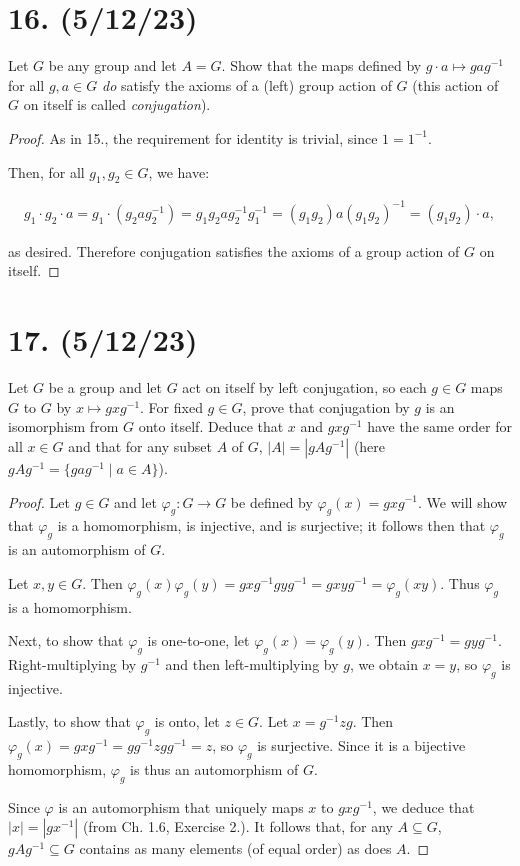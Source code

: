 \documentclass{article}
\begin{document}
\section*{16. (5/12/23)}

Let $G$ be any group and let $A = G$. Show that the maps defined by $g \cdot a \mapsto gag^{-1}$ for all $g, a \in G$ \emph{do} satisfy the axioms of a (left) group action of $G$ (this action of $G$ on itself is called \emph{conjugation}).

\begin{proof}
  As in 15., the requirement for identity is trivial, since $1 = 1^{-1}$.

  Then, for all $g_1, g_2 \in G$, we have:

  \begin{multline*}
    g_1 \cdot g_2 \cdot a = g_1 \cdot (g_2 a g_2^{-1}) = g_1 g_2 a g_2^{-1} g_1^{-1} = (g_1 g_2) a (g_1 g_2)^{-1} = (g_1 g_2) \cdot a,
  \end{multline*}

  as desired. Therefore conjugation satisfies the axioms of a group action of $G$ on itself.
\end{proof}

\section*{17. (5/12/23)}

Let $G$ be a group and let $G$ act on itself by left conjugation, so each $g \in G$ maps $G$ to $G$ by $x \mapsto gxg^{-1}$. For fixed $g \in G$, prove that conjugation by $g$ is an isomorphism from $G$ onto itself. Deduce that $x$ and $gxg^{-1}$ have the same order for all $x \in G$ and that for any subset $A$ of $G$, $|A| = |gAg^{-1}|$ (here $gAg^{-1} = \{ gag^{-1} \mid a \in A \}$).

\begin{proof}
  Let $g \in G$ and let $\varphi_g: G \rightarrow G$ be defined by $\varphi_g(x) = gxg^{-1}$. We will show that $\varphi_g$ is a homomorphism, is injective, and is surjective; it follows then that $\varphi_g$ is an automorphism of $G$.

  Let $x, y \in G$. Then $\varphi_g(x) \varphi_g(y) = gxg^{-1}gyg^{-1} = gxyg^{-1} = \varphi_g(xy)$. Thus $\varphi_g$ is a homomorphism.

  Next, to show that $\varphi_g$ is one-to-one, let $\varphi_g(x) = \varphi_g(y)$. Then $gxg^{-1} = gyg^{-1}$. Right-multiplying by $g^{-1}$ and then left-multiplying by $g$, we obtain $x = y$, so $\varphi_g$ is injective.

  Lastly, to show that $\varphi_g$ is onto, let $z \in G$. Let $x = g^{-1}zg$. Then $\varphi_g(x) = gxg^{-1} = gg^{-1}zgg^{-1} = z$, so $\varphi_g$ is surjective. Since it is a bijective homomorphism, $\varphi_g$ is thus an automorphism of $G$.

  Since $\varphi$ is an automorphism that uniquely maps $x$ to $gxg^{-1}$, we deduce that $|x| = |gx^{-1}|$ (from Ch. 1.6, Exercise 2.). It follows that, for any $A \subseteq G$, $gAg^{-1} \subseteq G$ contains as many elements (of equal order) as does $A$.
\end{proof}
\end{document}

